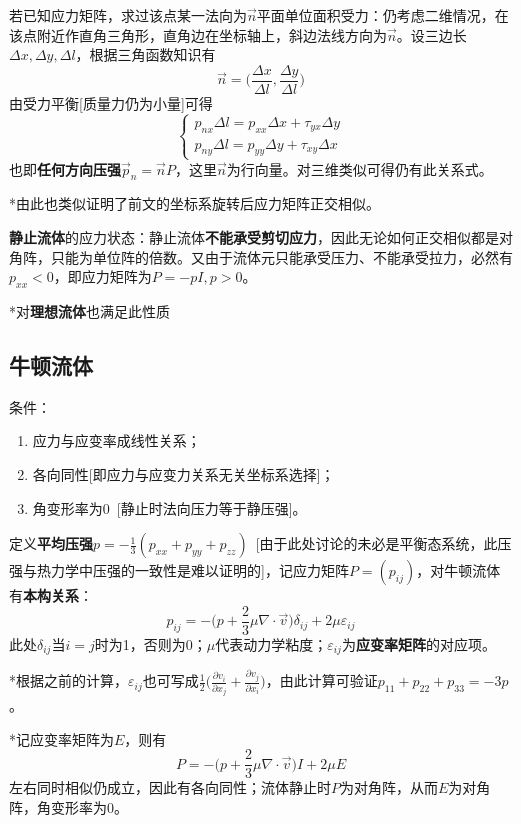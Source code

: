 \documentclass[a4paper,UTF8,fontset=windows]{ctexart}
\begin{document}
若已知应力矩阵，求过该点某一法向为$\vec{n}$平面单位面积受力：仍考虑二维情况，在该点附近作直角三角形，直角边在坐标轴上，斜边法线方向为$\vec{n}$。设三边长$\Delta x,\Delta y,\Delta l$，根据三角函数知识有
$$\vec{n}=\bigg(\frac{\Delta x}{\Delta l},\frac{\Delta y}{\Delta l}\bigg)$$
由受力平衡[质量力仍为小量]可得
$$\begin{cases}p_{nx}\Delta l=p_{xx}\Delta x+\tau_{yx}\Delta y\\p_{ny}\Delta l=p_{yy}\Delta y+\tau_{xy}\Delta x\end{cases}$$
也即\textbf{任何方向压强}$\vec{p}_n=\vec{n}P$，这里$\vec{n}$为行向量。对三维类似可得仍有此关系式。

*由此也类似证明了前文的坐标系旋转后应力矩阵正交相似。

\textbf{静止流体}的应力状态：静止流体\textbf{不能承受剪切应力}，因此无论如何正交相似都是对角阵，只能为单位阵的倍数。又由于流体元只能承受压力、不能承受拉力，必然有$p_{xx}<0$，即应力矩阵为$P=-pI,p>0$。

*对\textbf{理想流体}也满足此性质

\subsection{牛顿流体}

条件：
\begin{enumerate}
    \item 应力与应变率成线性关系；
    \item 各向同性[即应力与应变力关系无关坐标系选择]；
    \item 角变形率为0\ [静止时法向压力等于静压强]。
\end{enumerate}

定义\textbf{平均压强}$p=-\frac{1}{3}(p_{xx}+p_{yy}+p_{zz})$\ [由于此处讨论的未必是平衡态系统，此压强与热力学中压强的一致性是难以证明的]，记应力矩阵$P=(p_{ij})$，对牛顿流体有\textbf{本构关系}：
$$p_{ij}=-\bigg(p+\frac{2}{3}\mu\nabla\cdot\vec{v}\bigg)\delta_{ij}+2\mu\varepsilon_{ij}$$
此处$\delta_{ij}$当$i=j$时为1，否则为0；$\mu$代表动力学粘度；$\varepsilon_{ij}$为\textbf{应变率矩阵}的对应项。

*根据之前的计算，$\varepsilon_{ij}$也可写成$\frac{1}{2}\big(\frac{\partial v_i}{\partial x_j}+\frac{\partial v_j}{\partial x_i}\big)$，由此计算可验证$p_{11}+p_{22}+p_{33}=-3p$。

*记应变率矩阵为$E$，则有
$$P=-\bigg(p+\frac{2}{3}\mu\nabla\cdot\vec{v}\bigg)I+2\mu E$$
左右同时相似仍成立，因此有各向同性；流体静止时$P$为对角阵，从而$E$为对角阵，角变形率为0。
\end{document}
